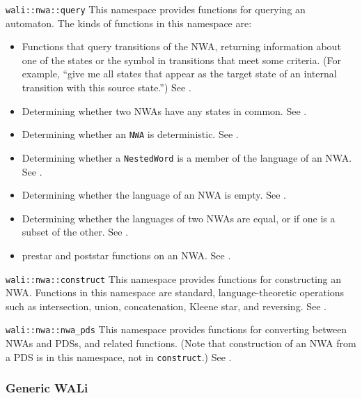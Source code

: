 \begin{description}
  \item\texttt{wali::nwa::query} This namespace provides functions for
    querying an automaton. The kinds of functions in this namespace are:
    \begin{itemize}
      \item Functions that query transitions of
        the NWA, returning information about one of the states or the symbol
        in transitions that meet some criteria. (For example, ``give me all
        states that appear as the target state of an internal transition with
        this source state.'') See .
      \item Determining whether two NWAs have any states in
        common. See .
      \item Determining whether an \texttt{NWA} is deterministic. See
        .
      \item Determining whether a \texttt{NestedWord} is a member of the
        language of an NWA. See .
      \item Determining whether the language of an NWA is empty. See
        .
      \item Determining whether the languages of two NWAs are equal, or if
        one is a subset of the other. See .
      \item prestar and poststar functions on an NWA. See
        .
    \end{itemize}
    
  \item\texttt{wali::nwa::construct} This namespace provides functions for
    constructing an NWA. Functions in this namespace are standard,
    language-theoretic operations such as intersection, union, concatenation,
    Kleene star, and reversing. See .
  \item\texttt{wali::nwa::nwa\_pds} This namespace provides functions for
    converting between NWAs and PDSs, and related functions. (Note that
    construction of an NWA from a PDS is in this namespace, not in
    \texttt{construct}.) See .
\end{description}


\subsubsection{Generic WALi}

